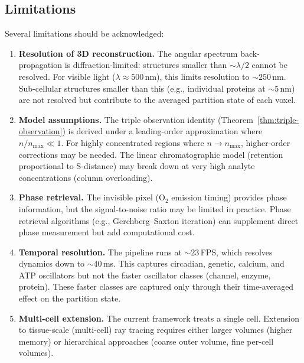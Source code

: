 \documentclass[11pt,twocolumn,a4paper]{article}
\begin{document}
\subsection{Limitations}

Several limitations should be acknowledged:

\begin{enumerate}[leftmargin=*,itemsep=2pt]
\item \textbf{Resolution of 3D reconstruction.} The angular spectrum
  back-propagation is diffraction-limited: structures smaller than
  $\sim\!\lambda/2$ cannot be resolved. For visible light ($\lambda
  \approx 500$\,nm), this limits resolution to $\sim\!250$\,nm.
  Sub-cellular structures smaller than this (e.g., individual proteins
  at $\sim\!5$\,nm) are not resolved but contribute to the averaged
  partition state of each voxel.

\item \textbf{Model assumptions.} The triple observation identity
  (Theorem~\ref{thm:triple-observation}) is derived under a
  leading-order approximation where $n/n_{\max} \ll 1$. For highly
  concentrated regions where $n \to n_{\max}$, higher-order
  corrections may be needed. The linear chromatographic model
  (retention proportional to S-distance) may break down at very high
  analyte concentrations (column overloading).

\item \textbf{Phase retrieval.} The invisible pixel (O$_2$ emission
  timing) provides phase information, but the signal-to-noise ratio
  may be limited in practice. Phase retrieval algorithms (e.g.,
  Gerchberg--Saxton iteration) can supplement direct phase measurement
  but add computational cost.

\item \textbf{Temporal resolution.} The pipeline runs at
  $\sim\!23$\,FPS, which resolves dynamics down to $\sim\!40$\,ms.
  This captures circadian, genetic, calcium, and ATP oscillators but
  not the faster oscillator classes (channel, enzyme, protein). These
  faster classes are captured only through their time-averaged effect
  on the partition state.

\item \textbf{Multi-cell extension.} The current framework treats a
  single cell. Extension to tissue-scale (multi-cell) ray tracing
  requires either larger volumes (higher memory) or hierarchical
  approaches (coarse outer volume, fine per-cell volumes).
\end{enumerate}
\end{document}
